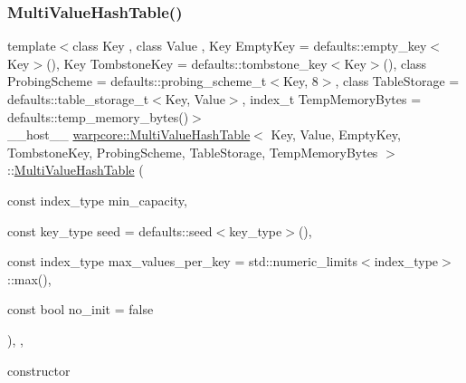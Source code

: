 \subsubsection{\texorpdfstring{Multi\+Value\+Hash\+Table()}{MultiValueHashTable()}\hspace{0.1cm}{\footnotesize\ttfamily [1/3]}}
{\footnotesize\ttfamily template$<$class Key , class Value , Key Empty\+Key = defaults\+::empty\+\_\+key$<$\+Key$>$(), Key Tombstone\+Key = defaults\+::tombstone\+\_\+key$<$\+Key$>$(), class Probing\+Scheme  = defaults\+::probing\+\_\+scheme\+\_\+t$<$\+Key, 8$>$, class Table\+Storage  = defaults\+::table\+\_\+storage\+\_\+t$<$\+Key, Value$>$, index\+\_\+t Temp\+Memory\+Bytes = defaults\+::temp\+\_\+memory\+\_\+bytes()$>$ \\
\+\_\+\+\_\+host\+\_\+\+\_\+ \hyperlink{classwarpcore_1_1MultiValueHashTable}{warpcore\+::\+Multi\+Value\+Hash\+Table}$<$ Key, Value, Empty\+Key, Tombstone\+Key, Probing\+Scheme, Table\+Storage, Temp\+Memory\+Bytes $>$\+::\hyperlink{classwarpcore_1_1MultiValueHashTable}{Multi\+Value\+Hash\+Table} (\begin{DoxyParamCaption}\item[{const index\+\_\+type}]{min\+\_\+capacity,  }\item[{const key\+\_\+type}]{seed = {\ttfamily defaults\+:\+:seed$<$key\+\_\+type$>$()},  }\item[{const index\+\_\+type}]{max\+\_\+values\+\_\+per\+\_\+key = {\ttfamily std\+:\+:numeric\+\_\+limits$<$index\+\_\+type$>$\+:\+:max()},  }\item[{const bool}]{no\+\_\+init = {\ttfamily false} }\end{DoxyParamCaption})\hspace{0.3cm}{\ttfamily [inline]}, {\ttfamily [explicit]}, {\ttfamily [noexcept]}}



constructor 


